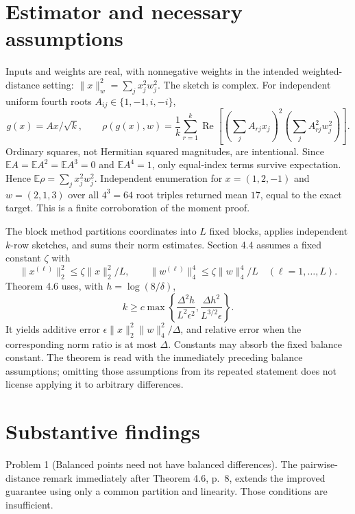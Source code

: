 \documentclass[10pt]{article}
\begin{document}
\section*{Estimator and necessary assumptions}
Inputs and weights are real, with nonnegative weights in the intended weighted-distance setting: \(\|x\|_w^2=\sum_jx_j^2w_j^2\). The sketch is complex. For independent uniform fourth roots \(A_{ij}\in\{1,-1,i,-i\}\), \[g(x)=Ax/\sqrt{k},\qquad
 \rho(g(x),w)=\frac1k\sum_{r=1}^k
 \operatorname{Re}\left[
       \left(\sum_jA_{rj}x_j\right)^2
       \left(\sum_j A_{rj}^2w_j^2\right)\right].\] Ordinary squares, not Hermitian squared magnitudes, are intentional. Since \(\mathbb EA=\mathbb EA^2=\mathbb EA^3=0\) and \(\mathbb EA^4=1\), only equal-index terms survive expectation. Hence \(\mathbb E\rho=\sum_jx_j^2w_j^2\). Independent enumeration for \(x=(1,2,-1)\) and \(w=(2,1,3)\) over all \(4^3=64\) root triples returned mean \(17\), equal to the exact target. This is a finite corroboration of the moment proof.\par
The block method partitions coordinates into \(L\) fixed blocks, applies independent \(k\)-row sketches, and sums their norm estimates. Section 4.4 assumes a fixed constant \(\zeta\) with \[\|x^{(\ell)}\|_2^2\le\zeta\|x\|_2^2/L,\qquad
 \|w^{(\ell)}\|_4^4\le\zeta\|w\|_4^4/L
 \quad(\ell=1,\ldots,L).\] Theorem 4.6 uses, with \(h=\log(8/\delta)\), \[k\ge c\max\left\{\frac{\Delta^2h}{L^2\epsilon^2},
                  \frac{\Delta h^2}{L^{3/2}\epsilon}\right\}.\] It yields additive error \(\epsilon\|x\|_2^2\|w\|_4^2/\Delta\), and relative error when the corresponding norm ratio is at most \(\Delta\). Constants may absorb the fixed balance constant. The theorem is read with the immediately preceding balance assumptions; omitting those assumptions from its repeated statement does not license applying it to arbitrary differences.\par
\section*{Substantive findings}
Problem 1 (Balanced points need not have balanced differences).  The pairwise-distance remark immediately after Theorem 4.6, p. 8, extends the improved guarantee using only a common partition and linearity. Those conditions are insufficient.\par
\end{document}
